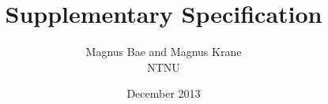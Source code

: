 \documentclass[english,10pt, oneside, a4paper]{article}
\begin{document}
\clearpage
\title{Supplementary Specification}
\author{Magnus Bae and Magnus Krane\\ NTNU}
\date{December 2013}

\makeatletter
\renewcommand{\l@section}{\@dottedtocline{1}{1.5em}{2.6em}}
\renewcommand{\l@subsection}{\@dottedtocline{2}{4.0em}{3.6em}}
\renewcommand{\l@subsubsection}{\@dottedtocline{3}{7.4em}{4.5em}}
\makeatother
\renewcommand{\thesection}{E.\arabic{section}}%

\setcounter{tocdepth}{5}
\setcounter{secnumdepth}{5}


\setcounter{page}{84}
\clearpage
\renewcommand\contentsname{Table of Contents}
\tableofcontents







\end{document}
